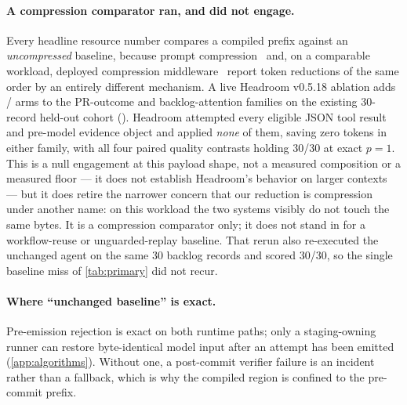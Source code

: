 \begin{table}[t]
  \centering
  \caption{Same-cohort transfer to : the three primary
  families rerun with the sealed records, discovery traces, and recompiled
  artifacts behind \cref{tab:primary}. Reductions are against the same-model
  baseline. The issue-type compiled-only miss (record 6532) is the finding the
  transfer protocol reports first; under re-discovery the compiler re-derives
  the identical issue-type and PR-outcome artifacts and refuses backlog routing
  on the second model's own traces.}
  \label{tab:second-model}
  \footnotesize
  \setlength{\tabcolsep}{4pt}
  
\end{table}

\paragraph{A compression comparator ran, and did not engage.}
Every headline resource number compares a compiled prefix against an
\emph{uncompressed} baseline, because prompt compression~\citep{jiang2023llmlingua} and, on a comparable
workload, deployed compression middleware~\citep{headroom2026} report token
reductions of the same order by an entirely different mechanism. A live Headroom v0.5.18 ablation adds
/ arms to the PR-outcome and
backlog-attention families on the existing 30-record held-out cohort
(). Headroom attempted
every eligible JSON tool result and pre-model evidence object and applied
\emph{none} of them, saving zero tokens in either family, with all four paired
quality contrasts holding 30/30 at exact $p{=}1$. This is a null engagement at
this payload shape, not a measured composition or a measured floor --- it does
not establish Headroom's behavior on larger contexts --- but it does retire the
narrower concern that our reduction is compression under another name: on this
workload the two systems visibly do not touch the same bytes. It is a
compression comparator only; it does not stand in for a workflow-reuse or
unguarded-replay baseline. That rerun also re-executed the unchanged agent on
the same 30 backlog records and scored 30/30, so the single baseline miss of
\cref{tab:primary} did not recur.



\paragraph{Where ``unchanged baseline'' is exact.}
Pre-emission rejection is exact on both runtime paths; only a staging-owning
runner can restore byte-identical model input after an attempt has been emitted
(\cref{app:algorithms}). Without one, a post-commit verifier failure is an
incident rather than a fallback, which is why the compiled region is confined to
the pre-commit prefix.

